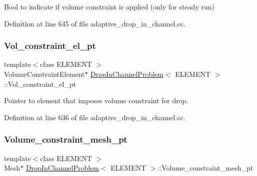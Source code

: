 Bool to indicate if volume constraint is applied (only for steady run) 



Definition at line 645 of file adaptive\+\_\+drop\+\_\+in\+\_\+channel.\+cc.

\mbox{\label{classDropInChannelProblem_ac7476353270d83e26d60f817c371572c}} 
\subsubsection{\texorpdfstring{Vol\+\_\+constraint\+\_\+el\+\_\+pt}{Vol\_constraint\_el\_pt}}
{\footnotesize\ttfamily template$<$class E\+L\+E\+M\+E\+NT $>$ \\
Volume\+Constraint\+Element$\ast$ \hyperlink{classDropInChannelProblem}{Drop\+In\+Channel\+Problem}$<$ E\+L\+E\+M\+E\+NT $>$\+::Vol\+\_\+constraint\+\_\+el\+\_\+pt\hspace{0.3cm}{\ttfamily [private]}}



Pointer to element that imposes volume constraint for drop. 



Definition at line 636 of file adaptive\+\_\+drop\+\_\+in\+\_\+channel.\+cc.

\mbox{\label{classDropInChannelProblem_ac5f5480fe22c40a175a0b5c0ce39fa05}} 
\subsubsection{\texorpdfstring{Volume\+\_\+constraint\+\_\+mesh\+\_\+pt}{Volume\_constraint\_mesh\_pt}}
{\footnotesize\ttfamily template$<$class E\+L\+E\+M\+E\+NT $>$ \\
Mesh$\ast$ \hyperlink{classDropInChannelProblem}{Drop\+In\+Channel\+Problem}$<$ E\+L\+E\+M\+E\+NT $>$\+::Volume\+\_\+constraint\+\_\+mesh\+\_\+pt\hspace{0.3cm}{\ttfamily [private]}}




